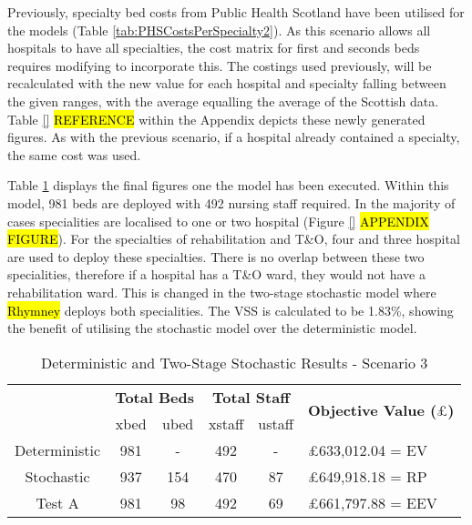 \documentclass[../thesis.tex]{subfiles}
\begin{document}
Previously, specialty bed costs from Public Health Scotland have been utilised for the models (Table \ref{tab:PHSCostsPerSpecialty2}). %
As this scenario allows all hospitals to have all specialties, the cost matrix for first and seconds beds requires modifying to incorporate this. The costings used previously, will be recalculated with the new value for each hospital and specialty falling between the given ranges, with the average equalling the average of the Scottish data. Table \ref{} \hl{REFERENCE} within the Appendix depicts these newly generated figures. As with the previous scenario, if a hospital already contained a specialty, the same cost was used.

Table \ref{tab:Scenario3Results} displays the final figures one the model has been executed. Within this model, 981 beds are deployed with 492 nursing staff required. In the majority of cases specialities are localised to one or two hospital (Figure \ref{} \hl{APPENDIX FIGURE}). For the specialties of rehabilitation and T\&O, four and three hospital are used to deploy these specialties. There is no overlap between these two specialities, therefore if a hospital has a T\&O ward, they would not have a rehabilitation ward. This is changed in the two-stage stochastic model where \hl{Rhymney} deploys both specialities. The VSS is calculated to be 1.83\%, showing the benefit of utilising the stochastic model over the deterministic model.

\begin{table}[h!]
    \centering
    \begin{tabular}{cccccl}\toprule
 & \multicolumn{2}{l}{\textbf{Total Beds}} & \multicolumn{2}{c}{\textbf{Total Staff}} & \multirow{2}{*}{\textbf{Objective Value ($\pounds$)}}\\ \cmidrule(lr){2-3} \cmidrule(lr){4-5}
         
 & xbed           & ubed          & xstaff         & ustaff         \\ \midrule
 Deterministic & 981  & - & 492 & - &$\pounds$633,012.04 = EV \\
 Stochastic & 937 & 154 & 470 & 87 & $\pounds$649,918.18 = RP \\
 Test A & 981 & 98 & 492 & 69 & $\pounds$661,797.88 = EEV \\\bottomrule
    \end{tabular}
    \caption{Deterministic and Two-Stage Stochastic Results - Scenario 3}
    \label{tab:Scenario3Results}
\end{table}
\end{document}
